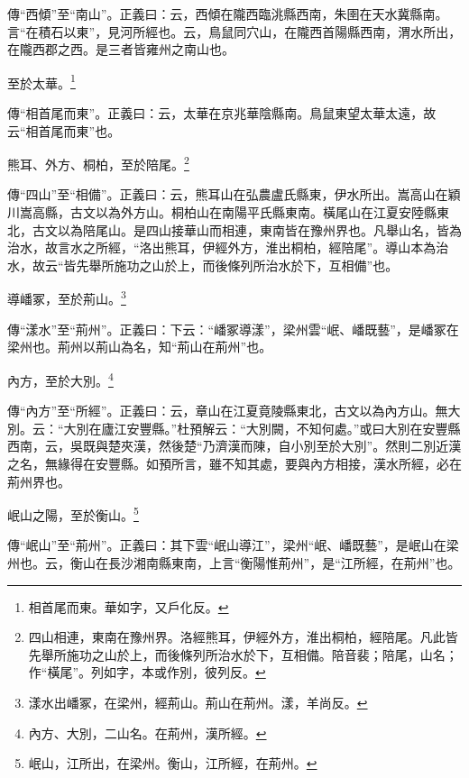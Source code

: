 {\noindent\zhuan{}\fzbyks 傳“西傾”至“南山”。正義曰：云，西傾在隴西臨洮縣西南，朱圉在天水冀縣南。言“在積石以東”，見河所經也。云，鳥鼠同穴山，在隴西首陽縣西南，渭水所出，在隴西郡之西。是三者皆雍州之南山也。 \par}

至於太華。\footnote{相首尾而東。華如字，又戶化反。}

{\noindent\zhuan{}\fzbyks 傳“相首尾而東”。正義曰：云，太華在京兆華陰縣南。鳥鼠東望太華太遠，故云“相首尾而東”也。 \par}

熊耳、外方、桐柏，至於陪尾。\footnote{四山相連，東南在豫州界。洛經熊耳，伊經外方，淮出桐柏，經陪尾。凡此皆先舉所施功之山於上，而後條列所治水於下，互相備。陪音裴；陪尾，山名；作“橫尾”。列如字，本或作別，彼列反。}

{\noindent\zhuan{}\fzbyks 傳“四山”至“相備”。正義曰：云，熊耳山在弘農盧氏縣東，伊水所出。嵩高山在穎川嵩高縣，古文以為外方山。桐柏山在南陽平氏縣東南。橫尾山在江夏安陸縣東北，古文以為陪尾山。是四山接華山而相連，東南皆在豫州界也。凡舉山名，皆為治水，故言水之所經，“洛出熊耳，伊經外方，淮出桐柏，經陪尾”。導山本為治水，故云“皆先舉所施功之山於上，而後條列所治水於下，互相備”也。 \par}

導嶓冢，至於荊山。\footnote{漾水出嶓冢，在梁州，經荊山。荊山在荊州。漾，羊尚反。}

{\noindent\zhuan{}\fzbyks 傳“漾水”至“荊州”。正義曰：下云：“嶓冢導漾”，梁州雲“岷、嶓既藝”，是嶓冢在梁州也。荊州以荊山為名，知“荊山在荊州”也。 \par}

內方，至於大別。\footnote{內方、大別，二山名。在荊州，漢所經。}

{\noindent\zhuan{}\fzbyks 傳“內方”至“所經”。正義曰：云，章山在江夏竟陵縣東北，古文以為內方山。無大別。云：“大別在廬江安豐縣。”杜預解云：“大別闕，不知何處。”或曰大別在安豐縣西南，云，吳既與楚夾漢，然後楚“乃濟漢而陳，自小別至於大別”。然則二別近漢之名，無緣得在安豐縣。如預所言，雖不知其處，要與內方相接，漢水所經，必在荊州界也。 \par}

岷山之陽，至於衡山。\footnote{岷山，江所出，在梁州。衡山，江所經，在荊州。}

{\noindent\zhuan{}\fzbyks 傳“岷山”至“荊州”。正義曰：其下雲“岷山導江”，梁州“岷、嶓既藝”，是岷山在梁州也。云，衡山在長沙湘南縣東南，上言“衡陽惟荊州”，是“江所經，在荊州”也。 \par}

